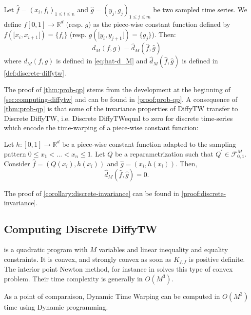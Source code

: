\begin{theorem}\label{thm:prob-qp}
Let $\hat f = (x_i, f_i)_{1 \leq i\leq n}$ and $\hat g = (y_j, g_j)_{1 \leq j\leq m}$ be two sampled time series. We define $f[0, 1]\to\mathbb R^d$ (resp. $g$) as the piece-wise constant function defined by $f([x_i, x_{i+1}[) = \lbrace f_i\rbrace$ (resp. $g([y_i, y_{j+1}[) = \lbrace g_j\rbrace$). Then:
\begin{equation}
d_M(f, g) = \hat d_M(\hat f, \hat g)
\end{equation}
where $d_M(f, g)$ is defined in \cref{eq:hat-d_M} and $\hat d_M(\hat f, \hat g)$ is defined in \cref{def:discrete-diffytw}.
\end{theorem}

The proof of \cref{thm:prob-qp} stems from the development at the beginning of \cref{sec:computing-diffytw} and can be found in \cref{proof:prob-qp}. A consequence of \cref{thm:prob-qp} is that some of the invariance properties of DiffyTW transfer to Discrete DiffyTW, i.e. Discrete DiffyTWequal to zero for discrete time-series which encode the time-warping of a piece-wise constant function:

\begin{corollary}\label{corollary:discrete-invariance}
Let $h: [0, 1] \to \mathbb R^d$ be a piece-wise constant function adapted to the sampling pattern $0 \leq x_1 < \ldots < x_n \leq 1$. Let $Q$ be a reparametrization such that $Q^\prime \in \mathcal F_{0,1}^M$. Consider $\hat f = (Q(x_i), h(x_i))$ and $\hat g = (x_i, h(x_i))$. Then,
\begin{equation}
    \hat d_M(\hat f, \hat g) = 0.
\end{equation}
\end{corollary}
The proof of \cref{corollary:discrete-invariance} can be found in \cref{proof:discrete-invariance}.

\subsection{Computing Discrete DiffyTW}\label{sec:solving-qp}

 is a quadratic program with $M$ variables and linear inequality and equality constraints. It is convex, and strongly convex as soon as $K_{f,f}$ is positive definite. The interior point Newton method, for instance in \cite{fabian} solves this type of convex problem. Their time complexity is generally in $O(M^3)$.

As a point of comparaison, Dynamic Time Warping can be computed in $O(M^2)$ time using Dynamic programming.

